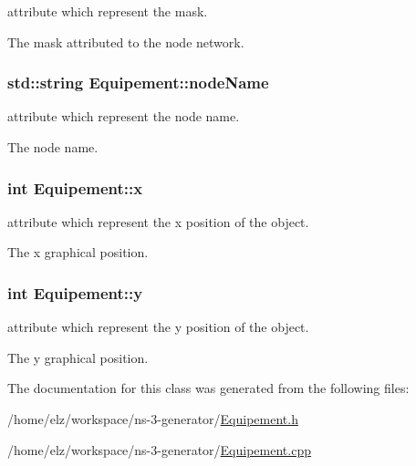 attribute which represent the mask. 

The mask attributed to the node network. \hypertarget{class_equipement_c83d966d9331f8b92ffa09b5eaf05816}{
\subsubsection[{nodeName}]{\setlength{\rightskip}{0pt plus 5cm}std::string {\bf Equipement::nodeName}}}
\label{class_equipement_c83d966d9331f8b92ffa09b5eaf05816}


attribute which represent the node name. 

The node name. \hypertarget{class_equipement_45ae2acbe57b1a47e7e9eeed67738109}{
\subsubsection[{x}]{\setlength{\rightskip}{0pt plus 5cm}int {\bf Equipement::x}}}
\label{class_equipement_45ae2acbe57b1a47e7e9eeed67738109}


attribute which represent the x position of the object. 

The x graphical position. \hypertarget{class_equipement_de92f12b5da5dde6f2b43921789cf676}{
\subsubsection[{y}]{\setlength{\rightskip}{0pt plus 5cm}int {\bf Equipement::y}}}
\label{class_equipement_de92f12b5da5dde6f2b43921789cf676}


attribute which represent the y position of the object. 

The y graphical position. 

The documentation for this class was generated from the following files:\begin{CompactItemize}
\item 
/home/elz/workspace/ns-3-generator/\hyperlink{_equipement_8h}{Equipement.h}\item 
/home/elz/workspace/ns-3-generator/\hyperlink{_equipement_8cpp}{Equipement.cpp}\end{CompactItemize}

